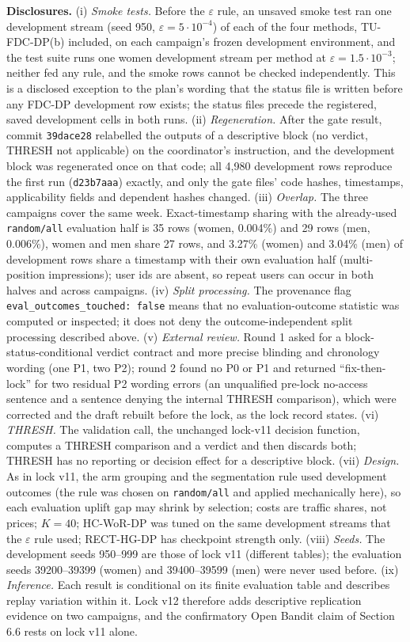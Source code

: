 \documentclass[sigconf,anonymous,review]{acmart}
\newcommand{\eps}{\varepsilon}
\begin{document}
\textbf{Disclosures.} (i) \emph{Smoke tests.} Before the $\eps$ rule, an unsaved smoke test ran one development stream (seed 950, $\eps = 5 \cdot 10^{-4}$) of each of the four methods, TU-FDC-DP(b) included, on each campaign's frozen development environment, and the test suite runs one women development stream per method at $\eps = 1.5 \cdot 10^{-3}$; neither fed any rule, and the smoke rows cannot be checked independently. This is a disclosed exception to the plan's wording that the status file is written before any FDC-DP development row exists; the status files precede the registered, saved development cells in both runs. (ii) \emph{Regeneration.} After the gate result, commit \texttt{39dace28} relabelled the outputs of a descriptive block (no verdict, THRESH not applicable) on the coordinator's instruction, and the development block was regenerated once on that code; all 4,980 development rows reproduce the first run (\texttt{d23b7aaa}) exactly, and only the gate files' code hashes, timestamps, applicability fields and dependent hashes changed. (iii) \emph{Overlap.} The three campaigns cover the same week. Exact-timestamp sharing with the already-used \texttt{random/all} evaluation half is 35 rows (women, 0.004\%) and 29 rows (men, 0.006\%), women and men share 27 rows, and 3.27\% (women) and 3.04\% (men) of development rows share a timestamp with their own evaluation half (multi-position impressions); user ids are absent, so repeat users can occur in both halves and across campaigns. (iv) \emph{Split processing.} The provenance flag \texttt{eval\_outcomes\_touched: false} means that no evaluation-outcome statistic was computed or inspected; it does not deny the outcome-independent split processing described above. (v) \emph{External review.} Round 1 asked for a block-status-conditional verdict contract and more precise blinding and chronology wording (one P1, two P2); round 2 found no P0 or P1 and returned ``fix-then-lock'' for two residual P2 wording errors (an unqualified pre-lock no-access sentence and a sentence denying the internal THRESH comparison), which were corrected and the draft rebuilt before the lock, as the lock record states. (vi) \emph{THRESH.} The validation call, the unchanged lock-v11 decision function, computes a THRESH comparison and a verdict and then discards both; THRESH has no reporting or decision effect for a descriptive block. (vii) \emph{Design.} As in lock v11, the arm grouping and the segmentation rule used development outcomes (the rule was chosen on \texttt{random/all} and applied mechanically here), so each evaluation uplift gap may shrink by selection; costs are traffic shares, not prices; $K = 40$; HC-WoR-DP was tuned on the same development streams that the $\eps$ rule used; RECT-HG-DP has checkpoint strength only. (viii) \emph{Seeds.} The development seeds 950--999 are those of lock v11 (different tables); the evaluation seeds 39200--39399 (women) and 39400--39599 (men) were never used before. (ix) \emph{Inference.} Each result is conditional on its finite evaluation table and describes replay variation within it. Lock v12 therefore adds descriptive replication evidence on two campaigns, and the confirmatory Open Bandit claim of Section 6.6 rests on lock v11 alone.
\end{document}
